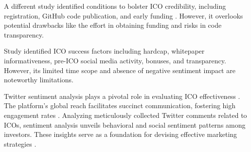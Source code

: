 \documentclass[runningheads]{llncs}
\begin{document}
A different study identified conditions to bolster ICO credibility, including registration, GitHub code publication, and early funding \cite{belitski2022success}. However, it overlooks potential drawbacks like the effort in obtaining funding and risks in code transparency.


Study \cite{lyandres2020ico} identified ICO success factors including hardcap, whitepaper informativeness, pre-ICO social media activity, bonuses, and transparency. However, its limited time scope and absence of negative sentiment impact are noteworthy limitations.


Twitter sentiment analysis plays a pivotal role in evaluating ICO effectiveness \cite{albrecht2020behavior}. The platform's global reach facilitates succinct communication, fostering high engagement rates \cite{mohd2020liability}. Analyzing meticulously collected Twitter comments related to ICOs, sentiment analysis unveils behavioral and social sentiment patterns among investors. These insights serve as a foundation for devising effective marketing strategies \cite{calderwood2019travel}.
\end{document}
